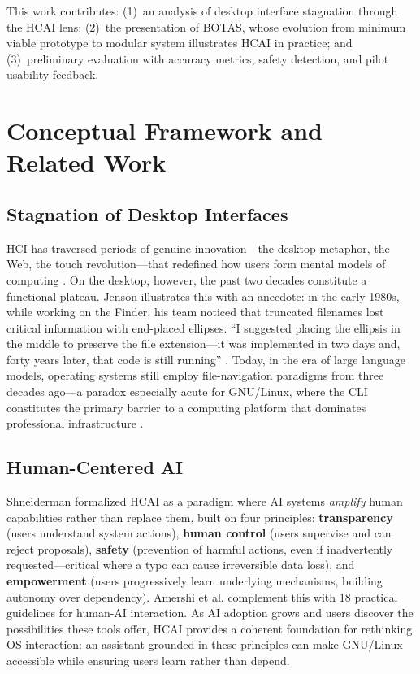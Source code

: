 \documentclass[12pt]{article}
\begin{document}
This work contributes: (1)~an analysis of desktop interface stagnation through the
HCAI lens; (2)~the presentation of BOTAS, whose evolution from minimum viable
prototype to modular system illustrates HCAI in practice; and (3)~preliminary
evaluation with accuracy metrics, safety detection, and pilot usability feedback.


\section{Conceptual Framework and Related Work}
\label{sec:framework}

\subsection{Stagnation of Desktop Interfaces}
\label{subsec:stagnation}

HCI has traversed periods of genuine innovation---the desktop metaphor, the Web,
the touch revolution---that redefined how users form mental models of computing
\cite{Norman1988}. On the desktop, however, the past two decades constitute a
functional plateau. Jenson \cite{Jenson2024} illustrates this with an anecdote:
in the early 1980s, while working on the Finder, his team noticed that truncated
filenames lost critical information with end-placed ellipses. ``I suggested placing
the ellipsis in the middle to preserve the file extension---it was implemented in
two days and, forty years later, that code is still running'' \cite{Jenson2024}.
Today, in the era of large language models, operating systems still employ
file-navigation paradigms from three decades ago---a paradox especially acute for
GNU/Linux, where the CLI constitutes the primary barrier to a computing platform
that dominates professional infrastructure \cite{W3Techs2023}.

\subsection{Human-Centered AI}
\label{subsec:hcai}

Shneiderman \cite{Shneiderman2020, Shneiderman2022} formalized HCAI as a paradigm
where AI systems \textit{amplify} human capabilities rather than replace them,
built on four principles: \textbf{transparency} (users understand system actions),
\textbf{human control} (users supervise and can reject proposals),
\textbf{safety} (prevention of harmful actions, even if inadvertently
requested---critical where a typo can cause irreversible data loss), and
\textbf{empowerment} (users progressively learn underlying mechanisms, building
autonomy over dependency). Amershi et al. \cite{Amershi2019} complement this with
18 practical guidelines for human-AI interaction. As AI adoption grows and users
discover the possibilities these tools offer, HCAI provides a coherent
foundation for rethinking OS interaction: an assistant grounded in these
principles can make GNU/Linux accessible while ensuring users learn rather than
depend.
\end{document}
